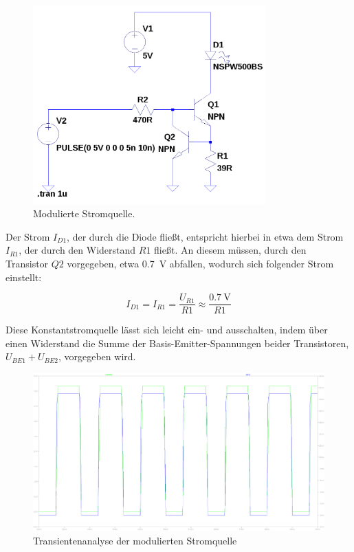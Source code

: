 \documentclass[12pt,a4paper]{article}
\begin{document}
\begin{figure}[H]
  \centering
    \includegraphics[width=0.8\textwidth]{../spice/modulated_current_source.png}
  \caption{Modulierte Stromquelle.}
  \label{fig:modulated_current_source}
\end{figure}

Der Strom $I_{D1}$, der durch die Diode fließt, entspricht hierbei in etwa dem Strom $I_{R1}$, der durch den Widerstand $R1$ fließt. An diesem müssen, durch den Transistor $Q2$ vorgegeben, etwa \SI{0.7}{\volt} abfallen, wodurch sich folgender Strom einstellt:

\begin{equation}
I_{D1} = I_{R1} = \frac{U_{R1}}{R1} \approx \frac{\SI{0.7}{\volt}}{R1}
\end{equation}

Diese Konstantstromquelle lässt sich leicht ein- und ausschalten, indem über einen Widerstand die Summe der Basis-Emitter-Spannungen beider Transistoren, $U_{BE1} + U_{BE2}$, vorgegeben wird.

\begin{figure}[H]
  \centering
    \includegraphics[width=1.0\textwidth]{../spice/current_input_v_current_out_trans.png}
  \caption{Transientenanalyse der modulierten Stromquelle}
  \label{fig:modulated_current_source_plot}
\end{figure}
\end{document}
